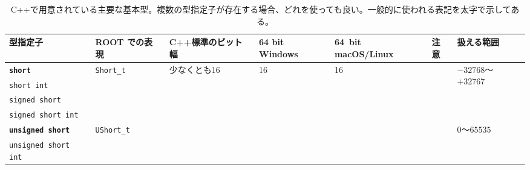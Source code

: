 \begin{landscape}
\begin{table}
  \centering
  \caption{C++で用意されている主要な基本型。複数の型指定子が存在する場合、どれを使っても良い。一般的に使われる表記を太字で示してある。}
  \label{table:primitive}
  \footnotesize
\begin{tabular}{|l|l|l|l|l|l|l|}
  \hline
型指定子 & ROOT での表現 & C++標準のビット幅 & 64 bit Windows & 64~bit macOS/Linux & 注意 & 扱える範囲 \\
\hline
\textbf{\texttt{short}}             & \multirow{4}{*}{\texttt{Short\_t}}   & \multirow{6}{*}{少なくとも16} & \multirow{6}{*}{16} & \multirow{6}{*}{16} & \multirow{6}{*}{}                                 & \multirow{4}{*}{$-32768$〜$+32767$}                                               \\ \cline{1-1}
\texttt{short int}                  &                   &                          &                     &                     &                                                   &                                                                                                                             \\ \cline{1-1}
\texttt{signed short}               &                   &                          &                     &                     &                                                   &                                                                                                                             \\ \cline{1-1}
\texttt{signed short int}           &                   &                          &                     &                     &                                                   &                                                                                                                             \\ \cline{1-3} \cline{7-7} 
\textbf{\texttt{unsigned short}}    & \multirow{2}{*}{\texttt{UShort\_t}}  &                          &                     &                     &                                                   & \multirow{2}{*}{$0$〜$65535$}                                                    \\ \cline{1-1}
\texttt{unsigned short int}         &                   &                          &                     &                     &                                                   &                                                                                                                             \\ \hline

\end{tabular}
\end{table}
\end{landscape}

